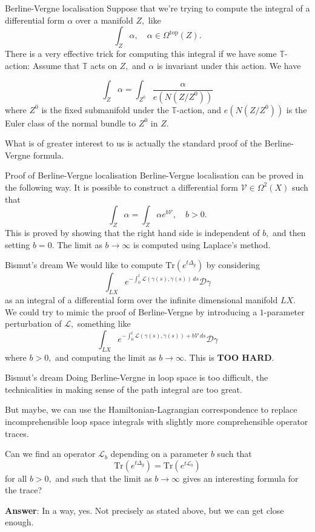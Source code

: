 \documentclass{beamer}
\numberwithin{equation}{section}
\theoremstyle{plain}
\theoremstyle{plain}
\theoremstyle{definition}
\theoremstyle{plain}
\theoremstyle{plain}
\theoremstyle{definition}
\newcommand{\Circ}{\mathbb{T}}
\newcommand{\Dc}{\mathcal{D}}
\newcommand{\Lc}{\mathcal{L}}
\newcommand{\Vc}{\mathcal{V}}
\newcommand{\Tr}{\mathrm{Tr}}
\begin{document}
\begin{frame}{Berline-Vergne localisation}
  Suppose that we're trying to compute the integral of a differential form $\alpha$ over a manifold $Z,$ like
  \[
    \int_Z \alpha,\quad \alpha\in \Omega^{\mathrm{top}}(Z).
  \]
  There is a very effective trick for computing this integral if we have some $\Circ$-action: Assume that $\Circ$ acts
  on $Z,$ and $\alpha$ is invariant under this action. We have
  \begin{theorem}
    \[
      \int_Z \alpha = \int_{Z^{0}} \frac{\alpha}{e(N(Z/Z^0))}
    \]
    where $Z^0$ is the fixed submanifold under the $\Circ$-action, and $e(N(Z/Z^0))$ is the Euler class of the normal bundle to $Z^0$ in $Z.$    
  \end{theorem}
  What is of greater interest to us is actually the standard proof of the Berline-Vergne formula.
\end{frame}

\begin{frame}{Proof of Berline-Vergne localisation}
    Berline-Vergne localisation can be proved in the following way. It is possible to construct a differential form $\Vc \in \Omega^2(X)$ such that
    \[
      \int_Z \alpha = \int_Z \alpha e^{b\Vc},\quad b>0.
    \]
    This is proved by showing that the right hand side is independent of $b,$ and then setting $b=0.$ The limit as $b\to\infty$ is computed using Laplace's method.    
\end{frame}

\begin{frame}{Bismut's dream}
  We would like to compute $\Tr(e^{t\Delta_g})$ by considering
  \[
    \int_{LX} e^{-\int_0^t \Lc(\gamma(s),\dot{\gamma}(s))\,ds} \Dc\gamma
  \]
  as an integral of a differential form over the infinite dimensional manifold $LX.$
  \pause
  We could try to mimic the proof of Berline-Vergne by introducing a $1$-parameter perturbation of $\Lc,$ something like
  \[
      \int_{LX} e^{-\int_0^t \Lc(\gamma(s),\dot{\gamma}(s))+b\Vc\,ds} \Dc\gamma
  \]
  where $b>0,$ and computing the limit as $b\to\infty.$
  \pause
  This is \textbf{TOO HARD}.
\end{frame}

\begin{frame}{Bismut's dream}
  Doing Berline-Vergne in loop space is too difficult, the technicalities in making sense of the path integral are too great. 
  
  But maybe, we can use the Hamiltonian-Lagrangian correspondence to replace incomprehensible loop space integrals with slightly more comprehensible operator traces.
  \begin{center}
    Can we find an operator $\Lc_b$ depending on a parameter $b$ such that
    \[
      \Tr(e^{t\Delta_g}) = \Tr(e^{t\Lc_b})
    \]
    for all $b>0,$ and such that the limit as $b\to\infty$ gives an interesting formula for the trace?
  \end{center}
  \textbf{Answer}: In a way, yes. Not precisely as stated above, but we can get close enough.
\end{frame}
\end{document}
